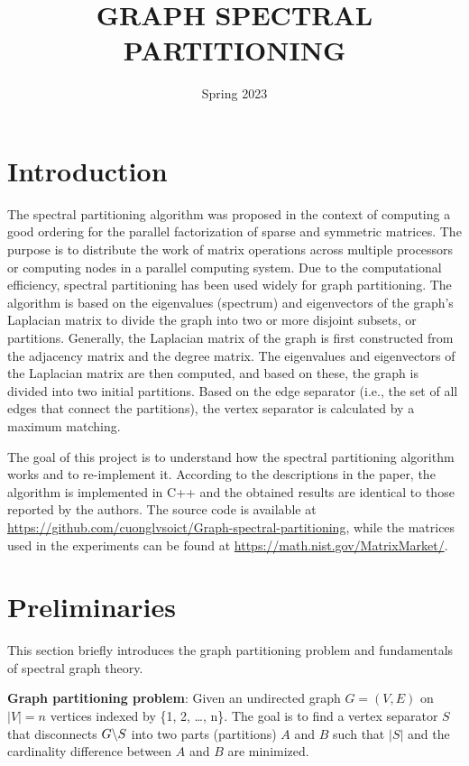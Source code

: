 \documentclass[pdftex, 12pt, a4paper]{article}
\title{\uppercase{Graph spectral partitioning
}}
\date{Spring 2023}
\begin{document}


\setcounter{page}{1}

\pagebreak


\section{Introduction}
The spectral partitioning algorithm \cite{pothen1990partitioning} was proposed in the context of computing a good ordering for the parallel factorization of sparse and symmetric matrices. 
The purpose is to distribute the work of matrix operations across multiple processors or computing nodes in a parallel computing system. Due to the computational efficiency, spectral partitioning has been used widely for graph partitioning. 
The algorithm is based on the eigenvalues (spectrum) and eigenvectors of the graph's Laplacian matrix to divide the graph into two or more disjoint subsets, or partitions. Generally, the Laplacian matrix of the graph is first constructed from the adjacency matrix and the degree matrix. The eigenvalues and eigenvectors of the Laplacian matrix are then computed, and based on these, the graph is divided into two initial partitions. Based on the edge separator (i.e., the set of all edges that connect the partitions), the vertex separator is calculated by a maximum matching.

The goal of this project is to understand how the spectral partitioning algorithm works and to re-implement it. According to the descriptions in the paper, the algorithm is implemented in C++ and the obtained results are identical to those reported by the authors. The source code is available at \url{https://github.com/cuonglvsoict/Graph-spectral-partitioning}, while the matrices used in the experiments can be found at \url{https://math.nist.gov/MatrixMarket/}.

\section{Preliminaries}
This section briefly introduces the graph partitioning problem and fundamentals of spectral graph theory.

\textbf{Graph partitioning problem}: Given an undirected graph $G = (V, E)$ on $|V| = n$ vertices indexed by \{1, 2, \ldots, n\}. The goal is to find a vertex separator $S$ that disconnects $G\symbol{92}S$ into two parts (partitions) $A$ and $B$ such that $|S|$ and the cardinality difference between $A$ and $B$ are minimized.
\end{document}
